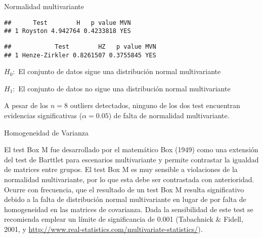 \documentclass[ignorenonframetext,]{beamer}
\newenvironment{Shaded}{\begin{snugshade}}{\end{snugshade}}
\newcommand{\KeywordTok}[1]{\textcolor[rgb]{0.13,0.29,0.53}{\textbf{#1}}}
\newcommand{\DataTypeTok}[1]{\textcolor[rgb]{0.13,0.29,0.53}{#1}}
\newcommand{\DecValTok}[1]{\textcolor[rgb]{0.00,0.00,0.81}{#1}}
\newcommand{\StringTok}[1]{\textcolor[rgb]{0.31,0.60,0.02}{#1}}
\newcommand{\OperatorTok}[1]{\textcolor[rgb]{0.81,0.36,0.00}{\textbf{#1}}}
\newcommand{\NormalTok}[1]{#1}
\begin{document}
\begin{frame}[fragile]{Normalidad multivariante}

\hypertarget{left}{}
\begin{verbatim}
##      Test        H   p value MVN
## 1 Royston 4.942764 0.4233818 YES
\end{verbatim}

\begin{verbatim}
##            Test        HZ   p value MVN
## 1 Henze-Zirkler 0.8261507 0.3755845 YES
\end{verbatim}

\hypertarget{right}{}
\begin{Shaded}
\end{Shaded}

\(H_0:\) El conjunto de datos sigue una distribución normal
multivariante

\(H_1:\) El conjunto de datos no sigue una distribución normal
multivariante

A pesar de los \(n=8\) outliers detectados, ninguno de los dos test
encuentran evidencias significativas (\(\alpha=0.05\)) de falta de
normalidad multivariante.

\end{frame}

\begin{frame}{Homogeneidad de Varianza}

El test Box M fue desarrollado por el matemático Box (1949) como una
extensión del test de Barttlet para escenarios multivariante y permite
contrastar la igualdad de matrices entre grupos. El test Box M es muy
sensible a violaciones de la normalidad multivariante, por lo que esta
debe ser contrastada con anterioridad. Ocurre con frecuencia, que el
resultado de un test Box M resulta significativo debido a la falta de
distribución normal multivariante en lugar de por falta de homogeneidad
en las matrices de covarianza. Dada la sensibilidad de este test se
recomienda emplear un límite de significancia de 0.001 (Tabachnick \&
Fidell, 2001, y
\url{http://www.real-statistics.com/multivariate-statistics/}).

\end{frame}
\end{document}

